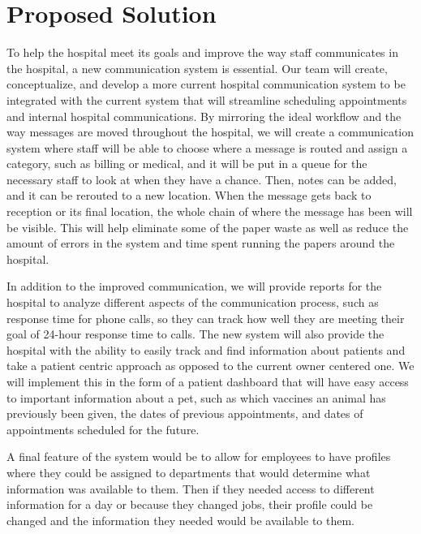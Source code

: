 \documentclass[onecolumn, draftclsnofoot,10pt, compsoc]{IEEEtran}
\begin{document}
\section{Proposed Solution}
To help the hospital meet its goals and improve the way staff communicates in the hospital, a new communication system is essential. Our team will create, conceptualize, and develop a more current hospital communication system to be integrated with the current system that will streamline scheduling appointments and internal hospital communications. By mirroring the ideal workflow and the way messages are moved throughout the hospital, we will create a communication system where staff will be able to choose where a message is routed and assign a category, such as billing or medical, and it will be put in a queue for the necessary staff to look at when they have a chance. Then, notes can be added, and it can be rerouted to a new location. When the message gets back to reception or its final location, the whole chain of where the message has been will be visible. This will help eliminate some of the paper waste as well as reduce the amount of errors in the system and time spent running the papers around the hospital.

In addition to the improved communication, we will provide reports for the hospital to analyze different aspects of the communication process, such as response time for phone calls, so they can track how well they are meeting their goal of 24-hour response time to calls.  The new system will also provide the hospital with the ability to easily track and find information about patients and take a patient centric approach as opposed to the current owner centered one. We will  implement this in the form of a patient dashboard that will have easy access to important information about a pet, such as which vaccines an animal has previously been given, the dates of previous appointments, and dates of appointments scheduled for the future.

A final feature of the system would be to allow for employees to have profiles where they could be assigned to departments that would determine what information was available to them. Then if they needed access to different information for a day or because they changed jobs, their profile could be changed and the information they needed would be available to them.
\end{document}
